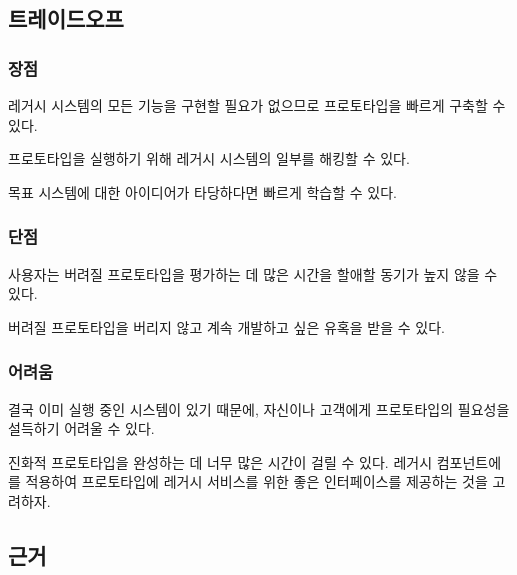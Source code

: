 \documentclass[a4paper,10pt,twoside]{book}
\begin{document}
\subsection*{트레이드오프}

\subsubsection*{장점}

\begin{bulletlist}
\item 레거시 시스템의 모든 기능을 구현할 필요가 없으므로 프로토타입을 빠르게 구축할 수 있다.

\item 프로토타입을 실행하기 위해 레거시 시스템의 일부를 해킹할 수 있다.

\item 목표 시스템에 대한 아이디어가 타당하다면 빠르게 학습할 수 있다.
\end{bulletlist}

\subsubsection*{단점}

\begin{bulletlist}
\item 사용자는 버려질 프로토타입을 평가하는 데 많은 시간을 할애할 동기가 높지 않을 수 있다.

\item 버려질 프로토타입을 버리지 않고 계속 개발하고 싶은 유혹을 받을 수 있다.
\end{bulletlist}

\subsubsection*{어려움}

\begin{bulletlist}
\item 결국 이미 실행 중인 시스템이 있기 때문에, 자신이나 고객에게 프로토타입의 필요성을 설득하기 어려울 수 있다.

\item 진화적 프로토타입을 완성하는 데 너무 많은 시간이 걸릴 수 있다. 레거시 컴포넌트에 를 적용하여 프로토타입에 레거시 서비스를 위한 좋은 인터페이스를 제공하는 것을 고려하자. 
\end{bulletlist}

\subsection*{근거}
\end{document}
